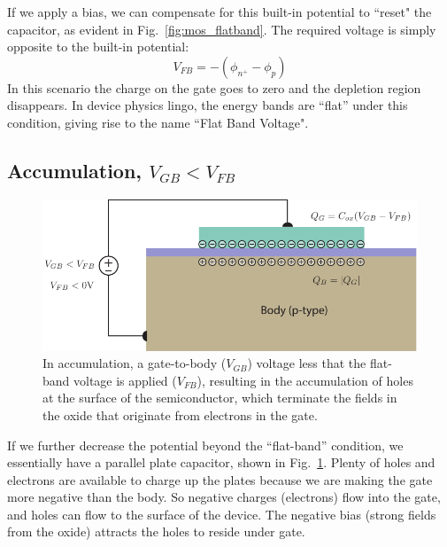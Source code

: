 If we apply a bias, we can compensate for this built-in potential to ``reset" the capacitor, as evident in Fig.~\ref{fig:mos_flatband}.  The required voltage is simply opposite to the built-in potential:
\begin{equation}
	{V_{FB}} =  - ({\phi _{{n^ + }}} - {\phi _p})
\end{equation}
In this scenario the charge on the gate goes to zero and the depletion region disappears.
 In device physics lingo, the energy bands are “flat” under this condition, giving rise to the name ``Flat Band Voltage".
\subsection{Accumulation, $V_{GB} < V_{FB}$}
\begin{figure}[tbh]
\begin{center}
\includegraphics[width=.75\columnwidth]{mos_cap_acc}
\end{center}
\caption{In accumulation, a gate-to-body ($V_{GB}$) voltage less that the flat-band voltage is applied ($V_{FB}$), resulting in the accumulation of holes at the surface of the semiconductor, which terminate the fields in the oxide that originate from electrons in the gate.}
\label{fig:mos_accum}
\end{figure}

If we further decrease the potential beyond the “flat-band” condition, we essentially have a parallel plate capacitor, shown in Fig.~\ref{fig:mos_accum}.  Plenty of holes and electrons are available to charge up the plates because we are making the gate more negative than the body.  So negative charges (electrons) flow into the gate, and holes can flow to the surface of the device.  The negative bias (strong fields from the oxide) attracts the holes to reside under gate.
